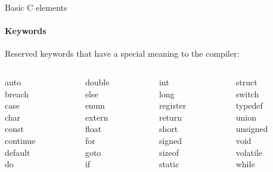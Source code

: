 \documentclass[10pt]{beamer}
\begin{document}
\begin{frame}{Basic C elements}
  \framesubtitle{Keywords}
  \centering
  Reserved keywords that have a special meaning to the compiler:
  \vspace*{10pt}
  
  \begin{columns}
    \begin{column}{0.2\textwidth}
      auto\\
      breach\\
      case\\
      char\\
      const\\
      continue\\
      default\\
      do
    \end{column}
    \begin{column}{0.2\textwidth}
      double\\
      else\\
      enum\\
      extern\\
      float\\
      for\\
      goto\\
      if
    \end{column}
    \begin{column}{0.2\textwidth}
      int\\
      long\\
      register\\
      return\\
      short\\
      signed\\
      sizeof\\
      static
    \end{column}
    \begin{column}{0.2\textwidth}
      struct\\
      switch\\
      typedef\\
      union\\
      unsigned\\
      void\\
      volatile\\
      while
    \end{column}
  \end{columns}
 
\end{frame}
\end{document}
